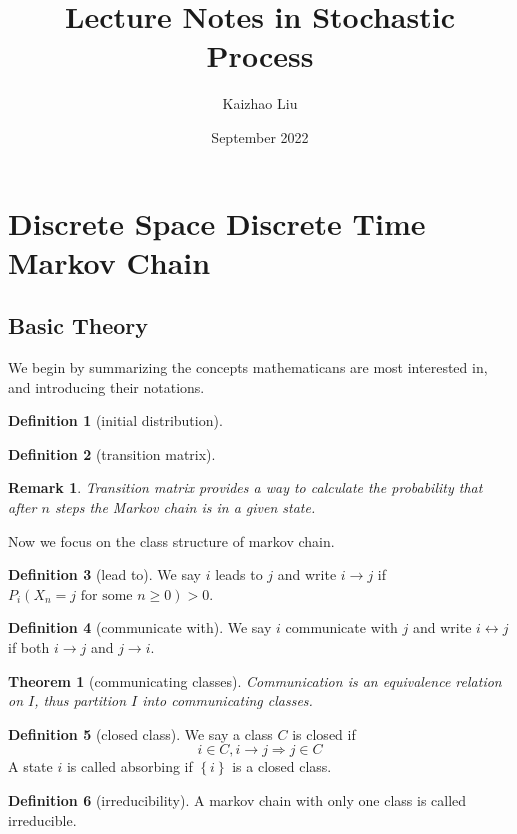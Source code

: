\documentclass{article}
\title{Lecture Notes in Stochastic Process}
\author{Kaizhao Liu}
\date{September 2022}
\newtheorem{Thm}{Theorem}[section]
\newtheorem*{Rk}{Remark}
\theoremstyle{definition}
\newtheorem{Def}{Definition}[section]
\begin{document}
\maketitle
\tableofcontents
\section{Discrete Space Discrete Time Markov Chain}
\subsection{Basic Theory}
We begin by summarizing the concepts mathematicans are most interested in, and introducing their notations. 
\begin{Def}[initial distribution]
    
\end{Def}

\begin{Def}[transition matrix]
    
\end{Def}
\begin{Rk}
Transition matrix provides a way to calculate the probability that after $n$ steps the Markov chain is in a given state.
\end{Rk}
Now we focus on the class structure of markov chain.
\begin{Def}[lead to]
    We say $i$ leads to $j$ and write $i\to j$ if $P_i(X_n=j\text{ for some }n\ge 0)>0$.
\end{Def}
\begin{Def}[communicate with]
    We say $i$ communicate with $j$ and write $i\leftrightarrow j$ if both $i\to j$ and $j\to i$.
\end{Def}
\begin{Thm}[communicating classes]
    Communication is an equivalence relation on $I$, thus partition $I$ into communicating classes.
\end{Thm}
\begin{Def}[closed class]
    We say a class $C$ is closed if \[i\in C,i\to j\Longrightarrow j\in C\]
    A state $i$ is called absorbing if $\left\{i\right\}$ is a closed class.
\end{Def}
\begin{Def}[irreducibility]
    A markov chain with only one class is called irreducible.
\end{Def}
\end{document}
